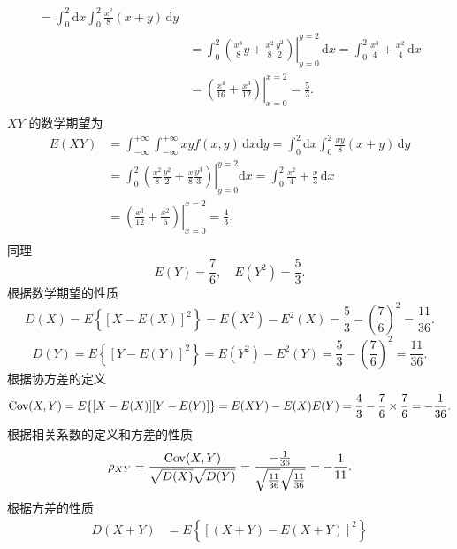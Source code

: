 \begin{solution}
$$\begin{aligned}
            = \int_0^2 \mathrm{d}x\int_0^2\frac{x^2}{8}(x+y)\,\mathrm{d}y                                                 \\
             & = \int_0^2 \left.\left(\frac{x^3}{8}y + \frac{x^2}{8}\frac{y^2}{2}\right)\right|_{y=0}^{y=2} \,\mathrm{d}x
            = \int_0^2 \frac{x^3}{4} + \frac{x^2}{4} \,\mathrm{d}x                                                        \\
             & = \left.\left(\frac{x^4}{16} + \frac{x^3}{12}\right)\right|_{x=0}^{x=2}  = \frac{5}{3}.                    \\
        \end{aligned}
    $$
    $XY$ 的数学期望为
    $$
        \begin{aligned}
            E(XY)
             & = \int_{-\infty}^{+\infty}\int_{-\infty}^{+\infty} xyf(x,y) \,\mathrm{d}x\mathrm{d}y = \int_0^2 \mathrm{d}x\int_0^2\frac{xy}{8}(x+y)\,\mathrm{d}y                      \\
             & = \int_0^2 \left.\left(\frac{x^2}{8}\frac{y^2}{2} + \frac{x}{8}\frac{y^3}{3}\right)\right|_{y=0}^{y=2}\mathrm{d}x = \int_0^2 \frac{x^2}{4} + \frac{x}{3} \,\mathrm{d}x \\
             & = \left.\left(\frac{x^3}{12} + \frac{x^2}{6}\right)\right|_{x=0}^{x=2}   = \frac{4}{3}.                                                                                \\
        \end{aligned}
    $$
    同理
    $$
        E(Y) = \frac{7}{6}, \quad E(Y^2) = \frac{5}{3}.
    $$
    根据数学期望的性质
    $$
        D(X)
        = E\left\{[X - E(X)]^2\right\}
        = E(X^2)-E^2(X)
        = \frac{5}{3}-\left(\frac{7}{6}\right)^2
        = \frac{11}{36}.
    $$
    $$
        D(Y)
        = E\left\{[Y - E(Y)]^2\right\}
        = E(Y^2)-E^2(Y)
        = \frac{5}{3}-\left(\frac{7}{6}\right)^2
        = \frac{11}{36}.
    $$
    根据协方差的定义
    $$
        \cov(X,Y)
        = E\{[X-E(X)][Y-E(Y)]\}
        = E(XY) - E(X)E(Y)
        = \frac{4}{3} - \frac{7}{6} \times \frac{7}{6}
        = -\frac{1}{36}.
    $$
    根据相关系数的定义和方差的性质
    $$
        \rho_{XY}
        = \frac{\cov(X,Y)}{\sqrt{D(X)}\sqrt{D(Y)}}
        = \frac{-\frac{1}{36}}{\sqrt{\frac{11}{36}}\sqrt{\frac{11}{36}}}
        = -\frac{1}{11}.
    $$
    根据方差的性质
    $$
        \begin{aligned}
            D(X+Y)
             & = E\left\{[(X+Y) - E(X+Y)]^2\right\}                                                          \\

\end{aligned}$$
\end{solution}
